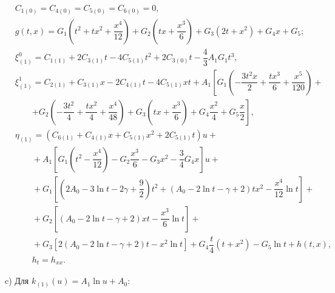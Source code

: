 \begin{align*}

& C_{1(0)}=C_{4(0)}=C_{5(0)}=C_{6(0)}=0, \\

& g(t,x)=G_1\left(t^2+tx^2+\dfrac{x^4}{12}\right)+G_2 \left(tx+\dfrac{x^3}{6}\right)+G_3 (2t+x^2)+G_4x+G_5; \\

& \xi^0_{(1)} = C_{1(1)}+2C_{3(1)}t-4C_{5(1)} t^2+2C_{3(0)}t-\dfrac{4}{3}A_1 G_1 t^3, \\

& \xi^1_{(1)} = C_{2(1)}+C_{3(1)} x -2C_{4(1)} t-4C_{5(1)} xt+ A_1 \left[ G_1 \left(-\dfrac{3t^2x}{2}+\dfrac{tx^3}{6}+\dfrac{x^5}{120} \right)+ \right. \\ 

& \qquad \left.+G_2 \left(-\dfrac{3t^2}{4}+\dfrac{tx^2}{4}+\dfrac{x^4}{48} \right)+

   G_3 \left(tx+\dfrac{x^3}{6} \right) +G_4 \dfrac{x^2}{4}+G_5 \dfrac{x}{2} \right],\\

& \eta_{(1)} = (C_{6(1)}+C_{4(1)} x +C_{5(1)} x^2 +2 C_{5(1)} t)u+\\

& \qquad + A_1 \left[G_1\left(t^2-\dfrac{x^4}{12}\right)-G_2 \dfrac{x^3}{6} -G_3 x^2 -\dfrac{3}{4}G_4 x  \right]u+ \\

& \qquad +G_1 \left[\left(2A_0-3\ln t-2\gamma+\dfrac{9}{2}\right)t^2+(A_0-2\ln t-\gamma+2)tx^2-\dfrac{x^4}{12}\ln t \right]+\\

& \qquad + G_2 \left[(A_0-2\ln t-\gamma+2)xt-\dfrac{x^3}{6} \ln t \right]+ \\

& \qquad + G_3 \left[2(A_0-2 \ln t -\gamma+2)t-x^2 \ln t \right]+ G_4 \dfrac{t}{4}(t+x^2)-G_5 \ln t + h(t,x),\\

& \qquad h_t=h_{xx}.



\end{align*} 



c) Для $k_{(1)}(u)=A_1 \ln u+A_0$:

